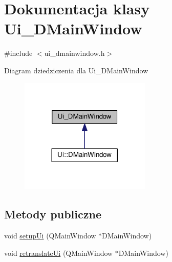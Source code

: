 \hypertarget{class_ui___d_main_window}{\section{Dokumentacja klasy Ui\-\_\-\-D\-Main\-Window}
\label{class_ui___d_main_window}
}


{\ttfamily \#include $<$ui\-\_\-dmainwindow.\-h$>$}



Diagram dziedziczenia dla Ui\-\_\-\-D\-Main\-Window\nopagebreak
\begin{figure}[H]
\begin{center}
\leavevmode
\includegraphics[width=176pt]{class_ui___d_main_window__inherit__graph}
\end{center}
\end{figure}
\subsection*{Metody publiczne}
\begin{DoxyCompactItemize}
\item 
void \hyperlink{class_ui___d_main_window_aa53f3a89bf520704a3e79037df2fd451}{setup\-Ui} (Q\-Main\-Window $\ast$D\-Main\-Window)
\item 
void \hyperlink{class_ui___d_main_window_a406169c751ddfd205b89375c7542827c}{retranslate\-Ui} (Q\-Main\-Window $\ast$D\-Main\-Window)
\end{DoxyCompactItemize}
